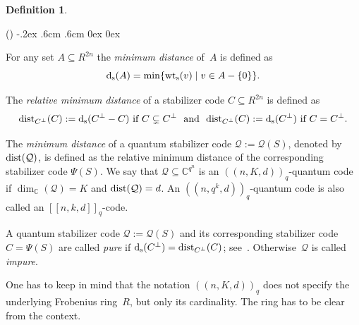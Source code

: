 \documentclass[11pt]{article}
\theoremstyle{definition}
\newtheorem{defi}[theo]{Definition}
\numberwithin{equation}{section}
\newcommand{\C}{{\mathbb C}}
\newcommand{\cQ}{{\mathcal Q}}
\newcommand{\wts}{\mbox{${\rm wt}_{\rm s}$}}
\newcommand{\ds}{\mbox{${\rm d}_{\rm s}$}}
\newcommand{\dist}{\textup{dist}}
\newcounter{alp}
\newcounter{rom}
\newenvironment{alphalist}{\begin{list}{(\alph{alp})\hfill}{\usecounter{alp}
     \topsep-.2ex \labelwidth.6cm \leftmargin.6cm \labelsep0cm
     \rightmargin0cm \parsep0ex \itemsep0ex}}{\end{list}}
\begin{document}
\begin{defi}\label{D-Dist}
\begin{alphalist}
\item For any set $A\subseteq R^{2n}$ the  \emph{minimum distance} of~$A$ is defined as
      \[
        \ds(A)=\min\{\wts(v)\mid v\in A-\{0\}\}.
      \]
\item The \emph{relative minimum distance} of a stabilizer code $C\subseteq R^{2n}$ is defined as
      \[
        \dist_{C^\perp}(C):=\ds(C^{\perp}-C) \text{ if }C\subsetneq C^\perp\ \text{ and }\
        \dist_{C^\perp}(C):=\ds(C^{\perp}) \text{ if }C=C^\perp.
      \]
\item The \emph{minimum distance} of a quantum stabilizer code $\cQ:=\cQ(S)$, denoted by $\dist(\cQ)$, is defined as the relative minimum distance of the corresponding
      stabilizer code $\Psi(S)$.
      We say that $\cQ\subseteq\C^{q^n}$ is an $(\!(n,K,d)\!)_q$-quantum code if $\dim_{\C}(\cQ)=K$ and $\dist(\cQ)=d$.
      An $(\!(n,q^k,d)\!)_q$-quantum code is also called an $[\![n,k,d]\!]_q$-code.
\item  A quantum stabilizer code $\cQ:=\cQ(S)$ and its corresponding stabilizer code~$C=\Psi(S)$ are
        called \emph{pure} if $\ds(C^\perp)=\dist_{C^\perp}(C)$; see~\cite[p.~1373]{CRSS98}. Otherwise~$\cQ$ is called \emph{impure}.
\end{alphalist}
\end{defi}

One has to keep in mind that the notation $(\!(n,K,d)\!)_q$ does not specify the underlying Frobenius ring~$R$, but only its cardinality.
The ring has to be clear from the context.
\end{document}
